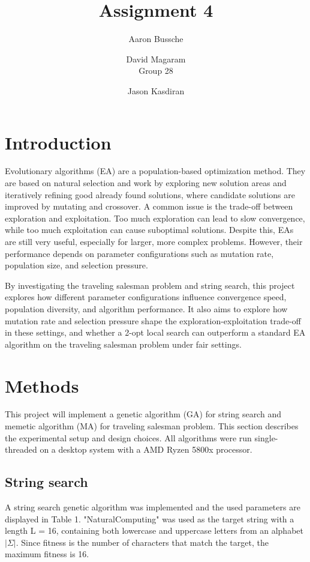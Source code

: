 \documentclass{article}
\title{Assignment 4}
\author{Aaron Bussche \and  David Magaram\\[0.3em] Group 28 \and Jason Kasdiran}
\begin{document}
	\maketitle

\section*{Introduction}
Evolutionary algorithms (EA) are a population-based optimization method. They are based on natural selection and work by exploring new solution areas and iteratively refining good already found solutions, where candidate solutions are improved by mutating and crossover. A common issue is the trade-off between exploration and exploitation. Too much exploration can lead to slow convergence, while too much exploitation can cause suboptimal solutions. Despite this, EAs are still very useful, especially for larger, more complex problems. However, their performance depends on parameter configurations such as mutation rate, population size, and selection pressure.

By investigating the traveling salesman problem and string search, this project explores how different parameter configurations influence convergence speed, population diversity, and algorithm performance. It also aims to explore how mutation rate and selection pressure shape the exploration-exploitation trade-off in these settings, and whether a 2-opt local search can outperform a standard EA algorithm on the traveling salesman problem under fair settings.




\section*{Methods}
This project will implement a genetic algorithm (GA) for string search and memetic algorithm (MA) for traveling salesman problem. This section describes the experimental setup and design choices.
All algorithms were run single-threaded on a desktop system with a AMD Ryzen 5800x processor.
\subsection*{String search}
A string search genetic algorithm was implemented and the used parameters are displayed in Table 1. "NaturalComputing" was used as the target string with a length L = 16, containing both lowercase and uppercase letters from an alphabet $|\Sigma|$. Since fitness is the number of characters that match the target, the maximum fitness is 16.
\end{document}
